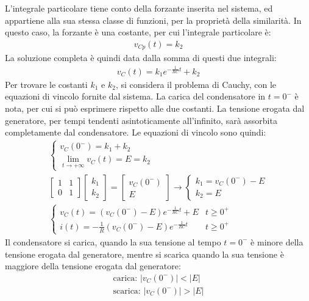 \documentclass{article}
\numberwithin{equation}{subsection}
\begin{document}
L'integrale particolare tiene conto della forzante inserita nel sistema, ed appartiene alla sua stessa classe di funzioni, per la proprietà della similarità. In questo caso, 
la forzante è una costante, per cui l'integrale particolare è:
\begin{gather*}
    v_{Cp}(t)=k_2
\end{gather*}
La soluzione completa è quindi data dalla somma di questi due integrali:
\begin{gather*}
    v_C(t)=k_1e^{-\frac{1}{RC}t}+k_2
\end{gather*}
Per trovare le costanti $k_1$ e $k_2$, si considera il problema di Cauchy, con le equazioni di vincolo fornite dal sistema. La carica del condensatore in $t=0^-$ è nota, 
per cui si può esprimere rispetto alle due costanti. La tensione erogata dal generatore, per tempi tendenti asintoticamente all'infinito, sarà assorbita 
completamente dal condensatore. Le equazioni di vincolo sono quindi:
\begin{gather*}
    \begin{cases}
        v_C(0^-)=k_1+k_2\\
        \displaystyle\lim_{t\to+\infty}v_C(t)=E=k_2
    \end{cases}\\
    \begin{bmatrix}
        1&1\\0&1
    \end{bmatrix}\begin{bmatrix}
        k_1\\k_2
    \end{bmatrix}=\begin{bmatrix}
        v_C(0^-)\\E
    \end{bmatrix}\to
    \begin{cases}
        k_1=v_C(0^-)-E\\
        k_2=E
    \end{cases}\\
    \begin{cases}
        v_C(t)=(v_C(0^-)-E)e^{-\frac{1}{RC}t}+E&t\geq0^+\\
        i(t)=-\displaystyle\frac{1}{R}(v_C(0^-)-E)e^{-\frac{1}{RC}t} &t\geq0^+
    \end{cases}
\end{gather*}
Il condensatore si carica, quando la sua tensione al tempo $t=0^-$ è minore della tensione erogata dal generatore, mentre si scarica quando la sua tensione è maggiore della 
tensione erogata dal generatore:
\begin{gather*}
    \mbox{carica: }|v_C(0^-)|<|E|\\
    \mbox{scarica: }|v_C(0^-)|>|E|
\end{gather*}
\end{document}
